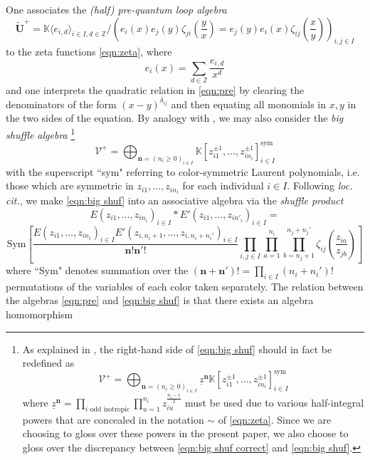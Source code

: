 \documentclass{amsart}
\def\BK{{\mathbb{K}}}
\def\BZ{{\mathbb{Z}}}
\def\CV{{\mathcal{V}}}
\def\sym{\textrm{sym}}
\def\bn{{\boldsymbol{n}}}
\begin{document}
\noindent One associates the \emph{(half) pre-quantum loop algebra} 
\begin{equation}
\label{eqn:pre}
\widetilde{\mathbf{U}}^+ = \BK \langle e_{i,d} \rangle_{i \in I, d\in \BZ} \Big/ \left(e_i(x)e_j(y) \zeta_{ji}\left(\frac yx\right) = e_j(y) e_i(x) \zeta_{ij}\left(\frac xy\right) \right)_{i,j \in I}
\end{equation}
to the zeta functions \eqref{eqn:zeta}, where 
\[
e_i(x) = \sum_{d \in \BZ} \frac {e_{i,d}}{x^d}
\]
and one interprets the quadratic relation in \eqref{eqn:pre} by clearing the denominators of the form $(x-y)^{\delta_{ij}}$ and then equating all monomials in $x,y$ in the two sides of the equation.  By analogy with \cite{E, FO}, we may also consider the \emph{big shuffle algebra} \footnote{As explained in \cite[Section 3.4]{NT}, the right-hand side of \eqref{eqn:big shuf} should in fact be redefined as
\begin{equation}
\label{eqn:big shuf correct}
\CV^+ = \bigoplus_{\bn = (n_i \geq 0)_{i \in I}} \underline{z}^{\bn} \BK[z_{i1}^{\pm 1}, \dots, z_{in_i}^{\pm 1}]^{\sym}_{i \in I}
\end{equation}
where $\underline{z}^{\bn} = \prod_{i \text{ odd isotropic}} \prod_{u=1}^{n_i} z_{iu}^{\frac {n_i-1}2}$ must be used due to various half-integral powers that are concealed in the notation $\sim$ of \eqref{eqn:zeta}. Since we are choosing to gloss over these powers in the present paper, we also choose to gloss over the discrepancy between \eqref{eqn:big shuf correct} and \eqref{eqn:big shuf}.}	
\begin{equation}
\label{eqn:big shuf}
\CV^+ = \bigoplus_{\bn = (n_i \geq 0)_{i \in I}} \BK\left[z_{i1}^{\pm 1}, \dots, z_{in_i}^{\pm 1}\right]^{\sym}_{i \in I}
\end{equation}
with the superscript ``sym" referring to color-symmetric Laurent polynomials, i.e. those which are symmetric in $z_{i1},\dots,z_{in_i}$ for each individual $i \in I$. Following \emph{loc. cit.}, we make \eqref{eqn:big shuf} into an associative algebra via the \emph{shuffle product} 
\begin{equation}
\label{eqn:shuffle product}
E(z_{i1},\dots,z_{in_i})_{i \in I} * E'(z_{i1},\dots,z_{in'_i})_{i \in I} = 
\end{equation}
$$
\text{Sym} \left[ \frac {E(z_{i1},\dots,z_{in_i})_{i \in I} E'(z_{i,n_i+1},\dots,z_{i,n_i+n_i'})_{i \in I}}{\bn!\bn'!} \prod_{i,j \in I} \prod_{a=1}^{n_i} \prod_{b=n_j+1}^{n_j+n_j'} \zeta_{ij} \left(\frac {z_{ia}}{z_{jb}} \right) \right] 
$$
where ``Sym" denotes summation over the $(\bn+\bn')! = \prod_{i \in I} (n_i+n_i')!$ permutations of the variables of each color taken separately. The relation between the algebras \eqref{eqn:pre} and \eqref{eqn:big shuf} is that there exists an algebra homomorphism
\end{document}
